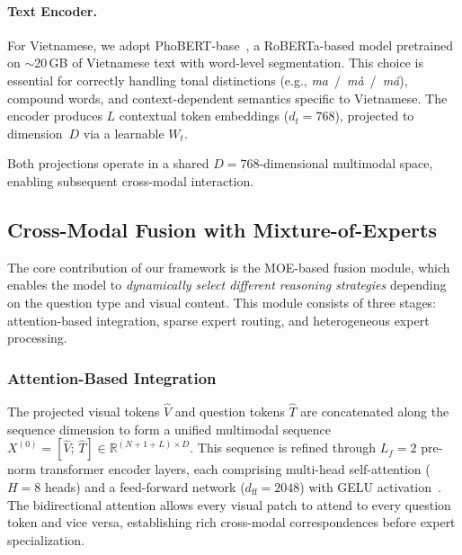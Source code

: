 \paragraph{Text Encoder.}
For Vietnamese, we adopt PhoBERT-base~\cite{nguyen2020phobert}, a RoBERTa-based model pretrained on ${\sim}$20\,GB of Vietnamese text with word-level segmentation. This choice is essential for correctly handling tonal distinctions (e.g., \textit{ma}~/~\textit{m\`a}~/~\textit{m\'a}), compound words, and context-dependent semantics specific to Vietnamese. The encoder produces $L$ contextual token embeddings ($d_t = 768$), projected to dimension~$D$ via a learnable $W_t$.

Both projections operate in a shared $D{=}768$-dimensional multimodal space, enabling subsequent cross-modal interaction.

\subsection{Cross-Modal Fusion with Mixture-of-Experts}
\label{sec:method:fusion}

The core contribution of our framework is the MOE-based fusion module, which enables the model to \textit{dynamically select different reasoning strategies} depending on the question type and visual content. This module consists of three stages: attention-based integration, sparse expert routing, and heterogeneous expert processing.

\subsubsection{Attention-Based Integration}
The projected visual tokens $\hat{V}$ and question tokens $\hat{T}$ are concatenated along the sequence dimension to form a unified multimodal sequence $X^{(0)} = [\hat{V};\, \hat{T}] \in \mathbb{R}^{(N{+}1{+}L) \times D}$. This sequence is refined through $L_f{=}2$ pre-norm transformer encoder layers, each comprising multi-head self-attention ($H{=}8$ heads) and a feed-forward network ($d_{\mathrm{ff}}{=}2048$) with GELU activation~\cite{hendrycks2016gaussian}. The bidirectional attention allows every visual patch to attend to every question token and vice versa, establishing rich cross-modal correspondences before expert specialization.

